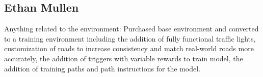 \documentclass[conference]{IEEEtran}
\begin{document}
\subsection{Ethan Mullen}
Anything related to the environment: Purchased base environment and converted to a training environment including the addition of fully functional traffic lights, customization of roads to increase consistency and match real-world roads more accurately, the addition of triggers with variable rewards to train model, the addition of training paths and path instructions for the model.



\end{document}
